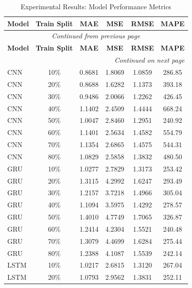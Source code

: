 
\begin{longtable}{l c c c c c}
    \toprule
    \textbf{Model} & \textbf{Train Split} & \textbf{MAE} & \textbf{MSE} & \textbf{RMSE} & \textbf{MAPE} \\
    \midrule
    \endfirsthead

    \multicolumn{6}{c}{{\textit{Continued from previous page}}} \\
    \toprule
    \textbf{Model} & \textbf{Train Split} & \textbf{MAE} & \textbf{MSE} & \textbf{RMSE} & \textbf{MAPE} \\
    \midrule
    \endhead

    \midrule \multicolumn{6}{r}{{\textit{Continued on next page}}} \\
    \endfoot

    \bottomrule
    \caption{Experimental Results: Model Performance Metrics}
    \label{tab:results_longtable}
    \endlastfoot
        CNN & 10\% & 0.8681 & 1.8069 & 1.0859 & 286.85 \\
        CNN & 20\% & 0.8688 & 1.6282 & 1.1373 & 393.18 \\
        CNN & 30\% & 0.9486 & 2.0066 & 1.2262 & 426.45 \\
        CNN & 40\% & 1.1402 & 2.4509 & 1.4444 & 668.24 \\
        CNN & 50\% & 1.0047 & 2.8460 & 1.2951 & 240.92 \\
        CNN & 60\% & 1.1401 & 2.5634 & 1.4582 & 554.79 \\
        CNN & 70\% & 1.1354 & 2.6865 & 1.4575 & 544.31 \\
        CNN & 80\% & 1.0829 & 2.5858 & 1.3832 & 480.50 \\
        GRU & 10\% & 1.0277 & 2.7829 & 1.3173 & 253.42 \\
        GRU & 20\% & 1.3115 & 4.2992 & 1.6247 & 293.49 \\
        GRU & 30\% & 1.2157 & 3.7218 & 1.4966 & 305.04 \\
        GRU & 40\% & 1.1094 & 3.5975 & 1.4292 & 278.57 \\
        GRU & 50\% & 1.4010 & 4.7749 & 1.7065 & 326.87 \\
        GRU & 60\% & 1.2414 & 4.2304 & 1.5521 & 240.48 \\
        GRU & 70\% & 1.3079 & 4.4699 & 1.6284 & 275.44 \\
        GRU & 80\% & 1.2388 & 4.1087 & 1.5539 & 242.14 \\
        LSTM & 10\% & 1.0217 & 2.6815 & 1.3120 & 267.04 \\
        LSTM & 20\% & 1.0793 & 2.9562 & 1.3831 & 252.11 \\

\end{longtable}

